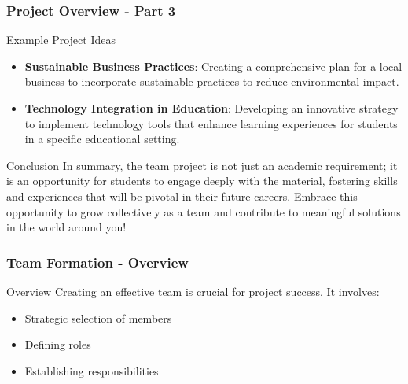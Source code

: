 \documentclass[aspectratio=169]{beamer}
\begin{document}
\begin{frame}[fragile]
  \frametitle{Project Overview - Part 3}
  \begin{block}{Example Project Ideas}
    \begin{itemize}
      \item \textbf{Sustainable Business Practices}: Creating a comprehensive plan for a local business to incorporate sustainable practices to reduce environmental impact.
      \item \textbf{Technology Integration in Education}: Developing an innovative strategy to implement technology tools that enhance learning experiences for students in a specific educational setting.
    \end{itemize}
  \end{block}

  \begin{block}{Conclusion}
    In summary, the team project is not just an academic requirement; it is an opportunity for students to engage deeply with the material, fostering skills and experiences that will be pivotal in their future careers. Embrace this opportunity to grow collectively as a team and contribute to meaningful solutions in the world around you!
  \end{block}
\end{frame}

\begin{frame}[fragile]
    \frametitle{Team Formation - Overview}
    \begin{block}{Overview}
        Creating an effective team is crucial for project success. It involves:
        \begin{itemize}
            \item Strategic selection of members
            \item Defining roles
            \item Establishing responsibilities
        \end{itemize}
    \end{block}
\end{frame}
\end{document}
